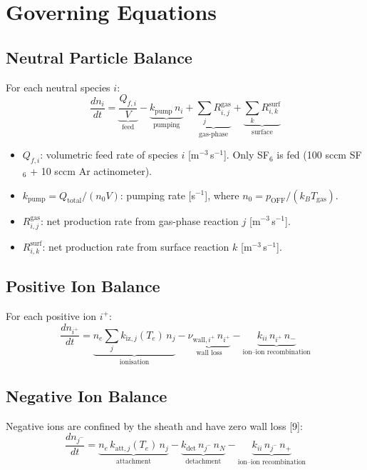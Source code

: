 \documentclass[11pt,a4paper]{article}
\begin{document}
\section{Governing Equations}

\subsection{Neutral Particle Balance}

For each neutral species $i$:
\begin{equation}\label{eq:neutral}
\boxed{\frac{dn_i}{dt} = \underbrace{\frac{Q_{f,i}}{V}}_\text{feed} - \underbrace{k_\text{pump}\,n_i}_\text{pumping} + \underbrace{\sum_j R^\text{gas}_{i,j}}_\text{gas-phase} + \underbrace{\sum_k R^\text{surf}_{i,k}}_\text{surface}}
\end{equation}

\begin{itemize}[nosep]
\item $Q_{f,i}$: volumetric feed rate of species $i$ [m$^{-3}$\,s$^{-1}$]. Only SF$_6$ is fed (100 sccm SF$_6$ + 10 sccm Ar actinometer).
\item $k_\text{pump} = Q_\text{total}/(n_0 V)$: pumping rate [s$^{-1}$], where $n_0 = p_\text{OFF}/(k_B T_\text{gas})$.
\item $R^\text{gas}_{i,j}$: net production rate from gas-phase reaction $j$ [m$^{-3}$\,s$^{-1}$].
\item $R^\text{surf}_{i,k}$: net production rate from surface reaction $k$ [m$^{-3}$\,s$^{-1}$].
\end{itemize}

\subsection{Positive Ion Balance}

For each positive ion $i^+$:
\begin{equation}\label{eq:ion}
\frac{dn_{i^+}}{dt} = \underbrace{n_e \sum_j k_{\text{iz},j}(T_e)\,n_j}_\text{ionisation} - \underbrace{\nu_{\text{wall},i^+}\,n_{i^+}}_\text{wall loss} - \underbrace{k_{ii}\,n_{i^+}\,n_-}_\text{ion--ion recombination}
\end{equation}

\subsection{Negative Ion Balance}

Negative ions are confined by the sheath and have zero wall loss [9]:
\begin{equation}
\frac{dn_{j^-}}{dt} = \underbrace{n_e \,k_{\text{att},j}(T_e)\,n_j}_\text{attachment} - \underbrace{k_\text{det}\,n_{j^-}\,n_N}_\text{detachment} - \underbrace{k_{ii}\,n_{j^-}\,n_+}_\text{ion--ion recombination}
\end{equation}
\end{document}
